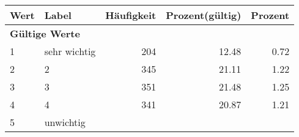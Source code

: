      \begin{longtable}{lXrrr}
     \toprule
     \textbf{Wert} & \textbf{Label} & \textbf{Häufigkeit} & \textbf{Prozent(gültig)} & \textbf{Prozent} \\
     \endhead
     \midrule
     \multicolumn{5}{l}{\textbf{Gültige Werte}}\\

     1 &
     \multicolumn{1}{X}{ sehr wichtig   } &


       \num{204} &
       \num[round-mode=places,round-precision=2]{12,48} &
         \num[round-mode=places,round-precision=2]{0,72} \\

     2 &
     \multicolumn{1}{X}{ 2   } &


       \num{345} &
       \num[round-mode=places,round-precision=2]{21,11} &
         \num[round-mode=places,round-precision=2]{1,22} \\

     3 &
     \multicolumn{1}{X}{ 3   } &


       \num{351} &
       \num[round-mode=places,round-precision=2]{21,48} &
         \num[round-mode=places,round-precision=2]{1,25} \\

     4 &
     \multicolumn{1}{X}{ 4   } &


       \num{341} &
       \num[round-mode=places,round-precision=2]{20,87} &
         \num[round-mode=places,round-precision=2]{1,21} \\

     5 &
     \multicolumn{1}{X}{ unwichtig   } &



\end{longtable}
